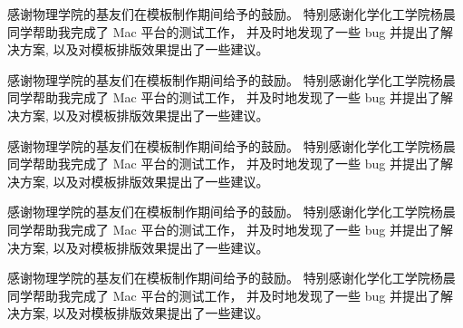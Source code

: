 \documentclass[pageheader,chapter,shorttitle,mathtxf]{NJUbachelor}
\begin{document}
\xingkai
感谢物理学院的基友们在模板制作期间给予的鼓励。
特别感谢化学化工学院杨晨同学帮助我完成了 Mac 平台的测试工作，
并及时地发现了一些 bug 并提出了解决方案,
以及对模板排版效果提出了一些建议。

\caiyun
感谢物理学院的基友们在模板制作期间给予的鼓励。
特别感谢化学化工学院杨晨同学帮助我完成了 Mac 平台的测试工作，
并及时地发现了一些 bug 并提出了解决方案,
以及对模板排版效果提出了一些建议。

\shuti
感谢物理学院的基友们在模板制作期间给予的鼓励。
特别感谢化学化工学院杨晨同学帮助我完成了 Mac 平台的测试工作，
并及时地发现了一些 bug 并提出了解决方案,
以及对模板排版效果提出了一些建议。

\lishu
感谢物理学院的基友们在模板制作期间给予的鼓励。
特别感谢化学化工学院杨晨同学帮助我完成了 Mac 平台的测试工作，
并及时地发现了一些 bug 并提出了解决方案,
以及对模板排版效果提出了一些建议。

\youyuan
感谢物理学院的基友们在模板制作期间给予的鼓励。
特别感谢化学化工学院杨晨同学帮助我完成了 Mac 平台的测试工作，
并及时地发现了一些 bug 并提出了解决方案,
以及对模板排版效果提出了一些建议。
\end{document}
